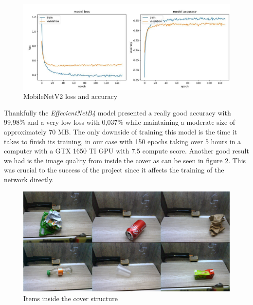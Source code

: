 \documentclass[a4paper,11pt]{article}
\begin{document}
\begin{figure}[H]
  \centering
  \includegraphics[width=12cm]{Figures/MobileNetV2_Loss_Acc.jpg}
  \caption{\small{MobileNetV2 loss and accuracy}}
  \label{fig:mobilenet}
\end{figure}

Thankfully the \textit{EffecientNetB4} model presented a really good accuracy with 99,98\% and a very low loss with 0,037\% while maintaining a moderate size of approximately 70 MB. The only downside of training this model is the time it takes to finish its training, in our case with 150 epochs taking over 5 hours in a computer with a GTX 1650 TI GPU with 7.5 compute score. Another good result we had is the image quality from inside the cover as can be seen in figure \ref{fig:itens}. This was crucial to the success of the project since it affects the training of the network directly.

\begin{figure}[H]
  \centering
  \includegraphics[width=12cm]{Figures/InsideCover.png}
  \caption{\small{Items inside the cover structure}}
  \label{fig:itens}
\end{figure}



\end{document}
